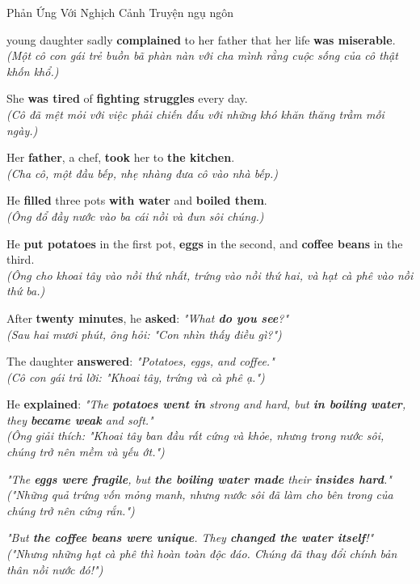 \begin{truyen}{Phản Ứng Với Nghịch Cảnh}%
              {Truyện ngụ ngôn}

young daughter sadly \textbf{complained} to her father that her life \textbf{was miserable}.\\
\textit{(Một cô con gái trẻ buồn bã phàn nàn với cha mình rằng cuộc sống của cô thật khốn khổ.)}

She \textbf{was tired} of \textbf{fighting struggles} every day.\\
\textit{(Cô đã mệt mỏi với việc phải chiến đấu với những khó khăn thăng trầm mỗi ngày.)}

Her \textbf{father}, a chef, \textbf{took} her to \textbf{the kitchen}.\\
\textit{(Cha cô, một đầu bếp, nhẹ nhàng đưa cô vào nhà bếp.)}

He \textbf{filled} three pots \textbf{with water} and \textbf{boiled them}.\\
\textit{(Ông đổ đầy nước vào ba cái nồi và đun sôi chúng.)}

He \textbf{put potatoes} in the first pot, \textbf{eggs} in the second, and \textbf{coffee beans} in the third.\\
\textit{(Ông cho khoai tây vào nồi thứ nhất, trứng vào nồi thứ hai, và hạt cà phê vào nồi thứ ba.)}

After \textbf{twenty minutes}, he \textbf{asked}: \textit{"What \textbf{do you see}?"}\\
\textit{(Sau hai mươi phút, ông hỏi: "Con nhìn thấy điều gì?")}

The daughter \textbf{answered}: \textit{"Potatoes, eggs, and coffee."}\\
\textit{(Cô con gái trả lời: "Khoai tây, trứng và cà phê ạ.")}

He \textbf{explained}: \textit{"The \textbf{potatoes went in} strong and hard, but \textbf{in boiling water}, they \textbf{became weak} and soft."}\\
\textit{(Ông giải thích: "Khoai tây ban đầu rất cứng và khỏe, nhưng trong nước sôi, chúng trở nên mềm và yếu ớt.")}

\textit{"The \textbf{eggs were fragile}, but \textbf{the boiling water made} their \textbf{insides hard}."}\\
\textit{("Những quả trứng vốn mỏng manh, nhưng nước sôi đã làm cho bên trong của chúng trở nên cứng rắn.")}

\textit{"But \textbf{the coffee beans were unique}. They \textbf{changed the water itself}!"}\\
\textit{("Nhưng những hạt cà phê thì hoàn toàn độc đáo. Chúng đã thay đổi chính bản thân nồi nước đó!")}
\end{truyen}

